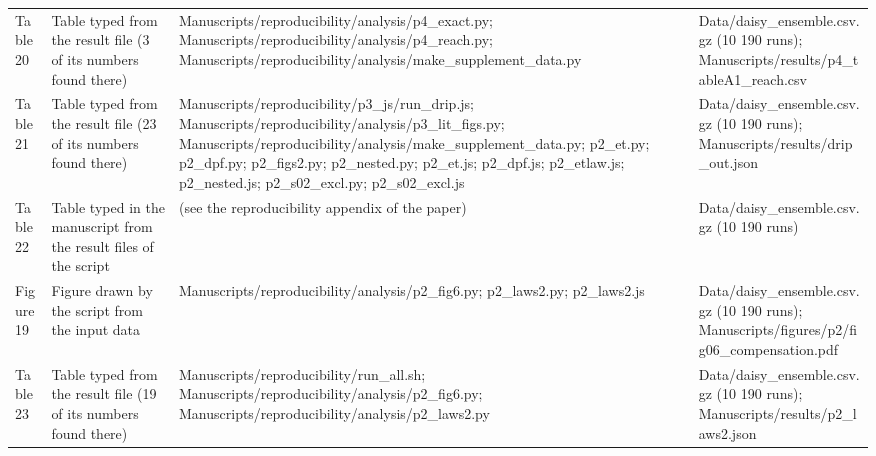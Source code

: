 {\begin{longtable}{p{}p{}p{}p{}}
{}Table 20 & Table typed from the result file (3 of its numbers found there) & Manuscripts/\allowbreak{}reproducibility/\allowbreak{}analysis/\allowbreak{}p4\_\allowbreak{}exact.py;  Manuscripts/\allowbreak{}reproducibility/\allowbreak{}analysis/\allowbreak{}p4\_\allowbreak{}reach.py;  Manuscripts/\allowbreak{}reproducibility/\allowbreak{}analysis/\allowbreak{}make\_\allowbreak{}supplement\_\allowbreak{}data.py & Data/\allowbreak{}daisy\_\allowbreak{}ensemble.csv.gz (10 190 runs);  Manuscripts/\allowbreak{}results/\allowbreak{}p4\_\allowbreak{}tableA1\_\allowbreak{}reach.csv\\
{}Table 21 & Table typed from the result file (23 of its numbers found there) & Manuscripts/\allowbreak{}reproducibility/\allowbreak{}p3\_\allowbreak{}js/\allowbreak{}run\_\allowbreak{}drip.js;  Manuscripts/\allowbreak{}reproducibility/\allowbreak{}analysis/\allowbreak{}p3\_\allowbreak{}lit\_\allowbreak{}figs.py;  Manuscripts/\allowbreak{}reproducibility/\allowbreak{}analysis/\allowbreak{}make\_\allowbreak{}supplement\_\allowbreak{}data.py;  p2\_\allowbreak{}et.py;  p2\_\allowbreak{}dpf.py;  p2\_\allowbreak{}figs2.py;  p2\_\allowbreak{}nested.py;  p2\_\allowbreak{}et.js;  p2\_\allowbreak{}dpf.js;  p2\_\allowbreak{}etlaw.js;  p2\_\allowbreak{}nested.js;  p2\_\allowbreak{}s02\_\allowbreak{}excl.py;  p2\_\allowbreak{}s02\_\allowbreak{}excl.js & Data/\allowbreak{}daisy\_\allowbreak{}ensemble.csv.gz (10 190 runs);  Manuscripts/\allowbreak{}results/\allowbreak{}drip\_\allowbreak{}out.json\\
{}Table 22 & Table typed in the manuscript from the result files of the script & (see the reproducibility appendix of the paper) & Data/\allowbreak{}daisy\_\allowbreak{}ensemble.csv.gz (10 190 runs)\\
{}Figure 19 & Figure drawn by the script from the input data & Manuscripts/\allowbreak{}reproducibility/\allowbreak{}analysis/\allowbreak{}p2\_\allowbreak{}fig6.py;  p2\_\allowbreak{}laws2.py;  p2\_\allowbreak{}laws2.js & Data/\allowbreak{}daisy\_\allowbreak{}ensemble.csv.gz (10 190 runs);  Manuscripts/\allowbreak{}figures/\allowbreak{}p2/\allowbreak{}fig06\_\allowbreak{}compensation.pdf\\
{}Table 23 & Table typed from the result file (19 of its numbers found there) & Manuscripts/\allowbreak{}reproducibility/\allowbreak{}run\_\allowbreak{}all.sh;  Manuscripts/\allowbreak{}reproducibility/\allowbreak{}analysis/\allowbreak{}p2\_\allowbreak{}fig6.py;  Manuscripts/\allowbreak{}reproducibility/\allowbreak{}analysis/\allowbreak{}p2\_\allowbreak{}laws2.py & Data/\allowbreak{}daisy\_\allowbreak{}ensemble.csv.gz (10 190 runs);  Manuscripts/\allowbreak{}results/\allowbreak{}p2\_\allowbreak{}laws2.json\\

\end{longtable}}
